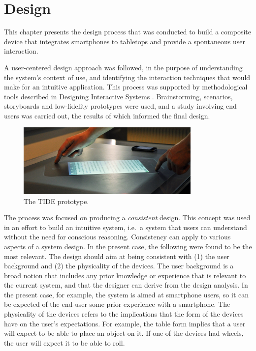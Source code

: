 
\chapter{Design}
\label{design}

This chapter presents the design process that was conducted to build a composite device that integrates smartphones to tabletops and provide a spontaneous user interaction.

A user-centered design approach was followed, in the purpose of understanding the system's context of use, and identifying the interaction techniques that would make for an intuitive application.
This process was supported by methodological tools described in Designing Interactive Systems \citep{Benyon:2010}.
Brainstorming, scenarios, storyboards and low-fidelity prototypes were used, and a study involving end users was carried out, the results of which informed the final design.

\begin{figure}[htb]
  \centering
    \includegraphics[width=0.8\textwidth]{images/tideHands}
    \caption{The TIDE prototype.}
    \label{fig:tideHands}
\end{figure}

The process was focused on producing a \emph{consistent} design.
This concept was used in an effort to build an intuitive system, i.e.\ a system that users can understand without the need for conscious reasoning.
Consistency can apply to various aspects of a system design.
In the present case, the following were found to be the most relevant.
The design should aim at being consistent with (1) the user background and (2) the physicality of the devices.
The user background is a broad notion that includes any prior knowledge or experience that is relevant to the current system, and that the designer can derive from the design analysis.
In the present case, for example, the system is aimed at smartphone users, so it can be expected of the end-user some prior experience with a smartphone.
The physicality of the devices refers to the implications that the form of the devices have on the user's expectations.
For example, the table form implies that a user will expect to be able to place an object on it.
If one of the devices had wheels, the user will expect it to be able to roll.


